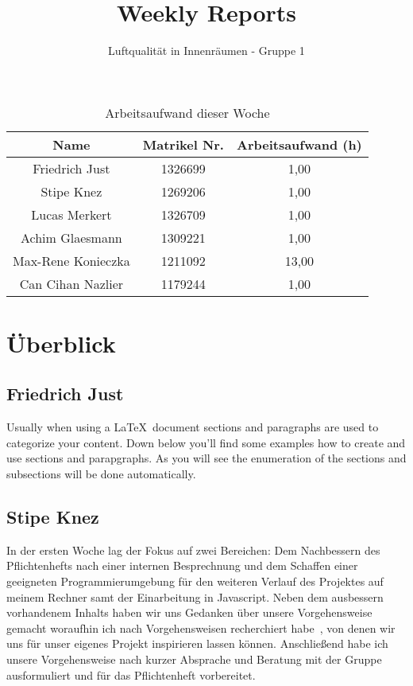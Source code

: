 \documentclass[]{article}
\title{Weekly Reports}
\author{Luftqualität in Innenräumen - Gruppe 1}
\begin{document}
\maketitle

\begin{table}[h!]
	\centering
	\begin{tabular}{|c|c|c|}
		\hline
		{\textbf{Name}}				&		{\textbf{Matrikel Nr.}} & {\textbf{Arbeitsaufwand (h)}} \\
		\hline
		Friedrich Just				&		1326699 				&	1,00	\\
		\hline
		Stipe Knez					&		1269206 				&	1,00	\\
		\hline
		Lucas Merkert				&		1326709					&	1,00	\\
		\hline
		Achim Glaesmann				&		1309221					&	1,00	\\
		\hline
		Max-Rene Konieczka			&		1211092					&	13,00	\\
		\hline
		Can Cihan Nazlier			&		1179244					&	1,00	\\
		\hline
	\end{tabular}
	\caption{Arbeitsaufwand dieser Woche}
	\label{tab:worakload}
\end{table}



\section{Überblick}


\subsection{Friedrich Just}
Usually when using a \LaTeX\ document sections and paragraphs are used to categorize your content. Down below you'll find some examples how to create and use sections and parapgraphs. As you will see the enumeration of the sections and subsections will be done automatically. 

\subsection{Stipe Knez}
In der ersten  Woche lag der Fokus auf zwei Bereichen: Dem Nachbessern des Pflichtenhefts nach einer internen Besprechnung und dem Schaffen einer geeigneten Programmierumgebung für den weiteren Verlauf des Projektes auf meinem Rechner samt der Einarbeitung in Javascript.
Neben dem ausbessern vorhandenem Inhalts haben wir uns Gedanken über unsere Vorgehensweise gemacht woraufhin ich nach Vorgehensweisen recherchiert habe~\cite{scrum}, von denen wir uns für unser eigenes Projekt inspirieren lassen können. Anschließend habe ich unsere Vorgehensweise nach kurzer Absprache und Beratung mit der Gruppe ausformuliert und für das Pflichtenheft vorbereitet.
\end{document}
